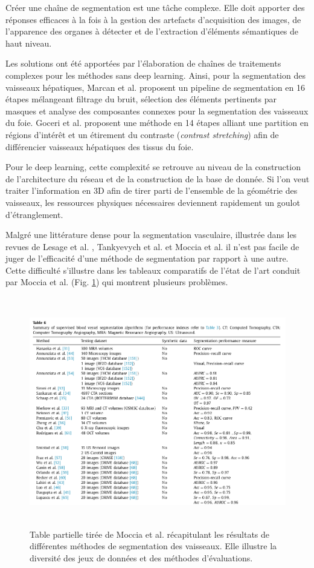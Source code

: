     Créer une chaîne de segmentation est une tâche complexe. Elle doit apporter des réponses efficaces à la fois à la gestion des artefacts d'acquisition des images, de l'apparence des organes à détecter et de l'extraction d'éléments sémantiques de haut niveau. 

    Les solutions ont été apportées par l'élaboration de chaînes de traitements complexes pour les méthodes sans deep learning. Ainsi, pour la segmentation des vaisseaux hépatiques, Marcan et al. \cite{Marcan2014_vessel_seg} proposent un pipeline de segmentation en 16 étapes mélangeant filtrage du bruit, sélection des éléments pertinents par masques et analyse des composantes connexes pour la segmentation des vaisseaux du foie. Goceri et al. \cite{Goceri2017_vessel} proposent une méthode en 14 étapes alliant une partition en régions d'intérêt et un étirement du contraste (\textit{contrast stretching}) afin de différencier vaisseaux hépatiques des tissus du foie.
  
    Pour le deep learning, cette complexité se retrouve au niveau de la construction de l'architecture du réseau et de la construction de la base de donnée. Si l'on veut traiter l'information en 3D afin de tirer parti de l'ensemble de la géométrie des vaisseaux, les ressources physiques nécessaires deviennent rapidement un goulot d'étranglement.  
    
    Malgré une littérature dense pour la segmentation vasculaire, illustrée dans les revues de Lesage et al. \cite{Lesage2009_review}, Tankyevych et al. \cite{Tankyevych2011_angiographic} et Moccia et al. \cite{Moccia2018_survey} il n'est pas facile de juger de l'efficacité d'une méthode de segmentation par rapport à une autre. Cette difficulté s'illustre dans les tableaux comparatifs de l'état de l'art conduit par  Moccia et al. (Fig. \ref{fig:moccia_table}) qui montrent plusieurs problèmes.

    \begin{figure}[h]
      \centering
      \includegraphics[height=10cm]{Images/Moccia_example.png}
      \caption{Table partielle tirée de Moccia et al. \cite{Moccia2018_survey} récapitulant les résultats de différentes méthodes de segmentation des vaisseaux. Elle illustre la diversité des jeux de données et des méthodes d'évaluations.}
      \label{fig:moccia_table}
    \end{figure}

